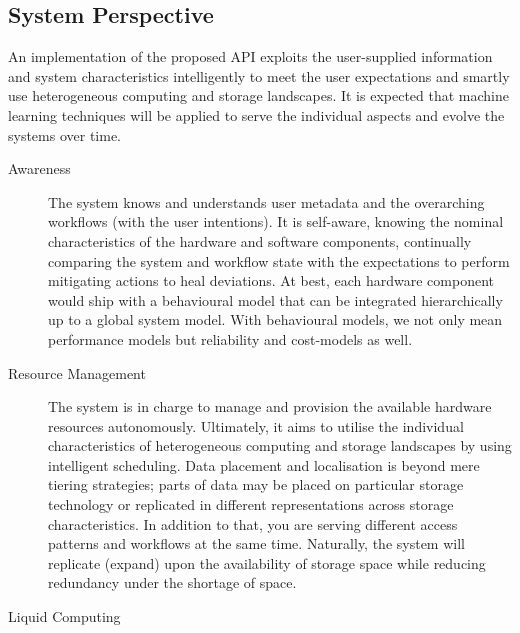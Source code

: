 \documentclass[a4paper]{article}
\begin{document}
{{\subsection{System Perspective}

An implementation of the proposed API exploits the user-supplied information and system characteristics intelligently to meet the user expectations and smartly use heterogeneous computing and storage landscapes.
It is expected that machine learning techniques will be applied to serve the individual aspects and evolve the systems over time.

\begin{description}

\item[Awareness]

The system knows and understands user metadata and the overarching workflows (with the user intentions).
It is self-aware, knowing the nominal characteristics of the hardware and software components, continually comparing the system and workflow state with the expectations to perform mitigating actions to heal deviations.
At best, each hardware component would ship with a behavioural model that can be integrated hierarchically up to a global system model.
With behavioural models, we not only mean performance models but reliability and cost-models as well.

\item[Resource Management]

The system is in charge to manage and provision the available hardware resources autonomously.
Ultimately, it aims to utilise the individual characteristics of heterogeneous computing and storage landscapes by using intelligent scheduling.
Data placement and localisation is beyond mere tiering strategies; parts of data may be placed on particular storage technology or replicated in different representations across storage characteristics.
In addition to that, you are serving different access patterns and workflows at the same time.
Naturally, the system will replicate (expand) upon the availability of storage space while reducing redundancy under the shortage of space.

\item[Liquid Computing]


\end{description}}}
\end{document}
